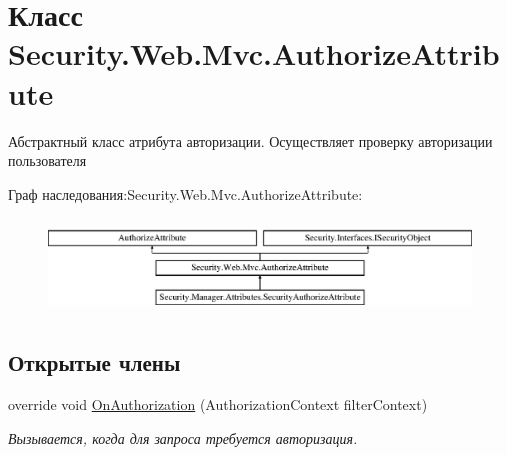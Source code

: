 \hypertarget{class_security_1_1_web_1_1_mvc_1_1_authorize_attribute}{}\section{Класс Security.\+Web.\+Mvc.\+Authorize\+Attribute}
\label{class_security_1_1_web_1_1_mvc_1_1_authorize_attribute}


Абстрактный класс атрибута авторизации. Осуществляет проверку авторизации пользователя  


Граф наследования\+:Security.\+Web.\+Mvc.\+Authorize\+Attribute\+:\begin{figure}[H]
\begin{center}
\leavevmode
\includegraphics[height=2.537765cm]{d1/da2/class_security_1_1_web_1_1_mvc_1_1_authorize_attribute}
\end{center}
\end{figure}
\subsection*{Открытые члены}
\begin{DoxyCompactItemize}
\item 
override void \hyperlink{class_security_1_1_web_1_1_mvc_1_1_authorize_attribute_ae216cd1b433a5b95fd9d3cefbc32cf31}{On\+Authorization} (Authorization\+Context filter\+Context)
\begin{DoxyCompactList}\small\item\em Вызывается, когда для запроса требуется авторизация. \end{DoxyCompactList}\end{DoxyCompactItemize}
